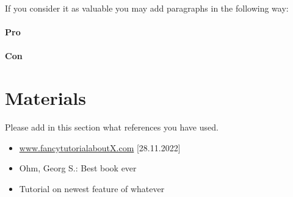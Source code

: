 \documentclass[fleqn,10pt]{SelfArx} %
\begin{document}
\noindent If you consider it as valuable you may add paragraphs in the following way:
\paragraph{Pro} \lipsum[8] %

\paragraph{Con} \lipsum[8] %


\section*{Materials}

Please add in this section what references you have used. 
\begin{itemize}[noitemsep] %
	\item \url{www.fancytutorialaboutX.com} [28.11.2022]
	\item Ohm, Georg S.: Best book ever
	\item Tutorial on newest feature of whatever
\end{itemize}


%
%

\end{document}
